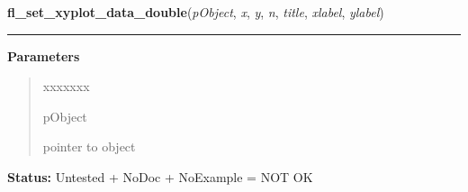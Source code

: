 \hspace{.8\funcindent}\begin{boxedminipage}{\funcwidth}

    \raggedright \textbf{fl\_set\_xyplot\_data\_double}(\textit{pObject}, \textit{x}, \textit{y}, \textit{n}, \textit{title}, \textit{xlabel}, \textit{ylabel})

    \vspace{-1.5ex}

    \rule{\textwidth}{0.5\fboxrule}
\setlength{\parskip}{2ex}
\setlength{\parskip}{1ex}
      \textbf{Parameters}
      \vspace{-1ex}

      \begin{quote}
        \begin{Ventry}{xxxxxxx}

          \item[pObject]

          pointer to object

        \end{Ventry}

      \end{quote}

\textbf{Status:} Untested + NoDoc + NoExample = NOT OK



    \end{boxedminipage}

    \label{xformslib:library:fl_set_xyplot_file}

    \vspace{0.5ex}

